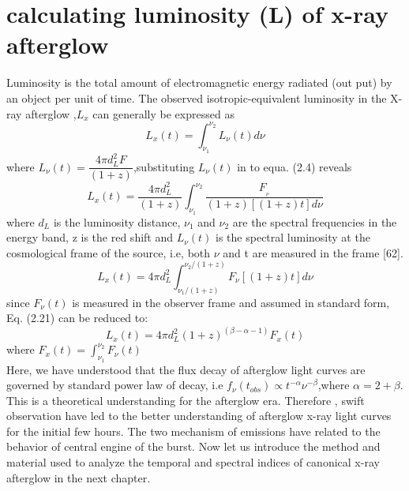 \section{calculating luminosity (L) of x-ray afterglow}
Luminosity is the total amount of electromagnetic energy radiated (out put) by an  object per unit of time. The observed isotropic-equivalent luminosity in the X-ray afterglow ,$ L_{x} $ can generally be expressed as 
\begin{equation}
L_{x}(t)= \int_{\nu_{1}}^{\nu_{2}} L_{\nu}(t)d\nu
\end{equation}
 where $ L_{\nu}(t)=\dfrac{4 \pi d_{L}^{2} F}{(1+z)} $,substituting  $L_{\nu}(t)$ in to equa. (2.4) reveals 
 \begin{equation}
 L_{x}(t)=\dfrac{4 \pi d_{L}^{2}}{(1+z)}\int_{\nu_{1}}^{\nu_{2}}\frac{F_{_{\nu}}}{(1+z)[(1+z)t]d\nu} 
 \end{equation}
where $ d_{L} $ is the luminosity distance, $\nu_{1}$  and $ \nu_{2} $ are the spectral frequencies in the energy band, z is the red shift and $ L_{\nu}  (t) $ is the spectral luminosity at the cosmological frame of the source, i.e, both $\nu $ and t are  measured in the frame [62].
\begin{equation}
L_{x}(t) = 4\pi d_{L}^{2}\int_{\nu_{1}/(1+z)}^{\nu_{2}/(1+z)}F_{\nu}[(1+z)t]d\nu
\end{equation}
since $F_{\nu}  (t) $ is measured in the observer frame and assumed in standard form, Eq. (2.21) can be reduced to:
\begin{equation}
L_{x}(t) = 4\pi d_{L}^{2}(1+z)^{(\beta-\alpha -1)} F_{x}(t)
\end{equation}
where $ F_{x}(t)  = \int _{\nu_{1}} ^{\nu_{2}}F_{\nu}(t)$ \\
Here, we have understood that the flux decay of afterglow light curves are governed by standard power law of decay, i.e $ f _{\nu}(t_{obs})  \propto t^{-\alpha} \nu^{-\beta} $,where $ \alpha = 2+\beta $. This is a theoretical understanding for the afterglow era. Therefore , swift observation have led to the better understanding of afterglow  x-ray light curves for the initial few hours. The two mechanism of emissions have related to the behavior of central engine of the burst. Now let us introduce the method and material used to  analyze the temporal and spectral indices of canonical x-ray  afterglow in the next chapter.

